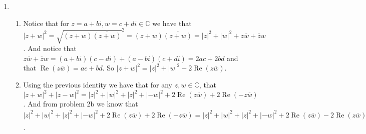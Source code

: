 \documentclass[12pt]{amsart}
\theoremstyle{definition}
\newcommand{\C}{\mathbb{C}}
\newcommand{\R}{\mathbb{R}}
\DeclareMathOperator{\Real}{\mathrm{Re}}
\DeclareMathOperator{\Imag}{\mathrm{Im}}
\begin{document}
\begin{enumerate}
\begin{enumerate}[label=(\alph*)]
    \item Now consider an element $z=c+di\in \C$ and notice that for any $a\in \R$ we have that $\Real(az)=\Real(ac+adi)=ac=a \Real(a+di)=a\Real(z)$. And similarly we have that $\Imag(az)=\Imag(ac+adi)=ad=a \Imag(a+di)=a\Imag(z)$.\\

    \end{enumerate}

    \item
    \begin{enumerate}[label=(\alph*)]
    \item Notice that for $z=a+bi,w=c+di\in \C$ we have that $|z+w|^2=\sqrt{(z+w)\overline{(z+w)}}^2= (z+w)\overline{(z+w)}= |z|^2+|w|^2+z\overline{w}+\overline{z}w$. And notice that $z\overline{w}+\overline{z}w=(a+bi)(c-di)+(a-bi)(c+di)=2ac+2bd$ and that $\Real(z\overline{w})=ac+bd$. So $|z+w|^2=|z|^2+|w|^2+2\Real(z\overline{w})$.\\

    \item Using the previous identity we have that for any $z,w\in \C$, that $|z+w|^2+|z-w|^2= |z|^2+|w|^2+|z|^2+|-w|^2+2\Real(z\overline{w})+2\Real(-z\overline{w})$. And from problem 2b we know that $|z|^2+|w|^2+|z|^2+|-w|^2+2\Real(z\overline{w})+2\Real(-z\overline{w})=|z|^2+|w|^2+|z|^2+|-w|^2+2\Real(z\overline{w})-2\Real(z\overline{w})=|z|^2+|w|^2+|z|^2+|w|^2=2(|z|^2+|w|^2)$.
\end{enumerate}


\end{enumerate}
\end{document}
